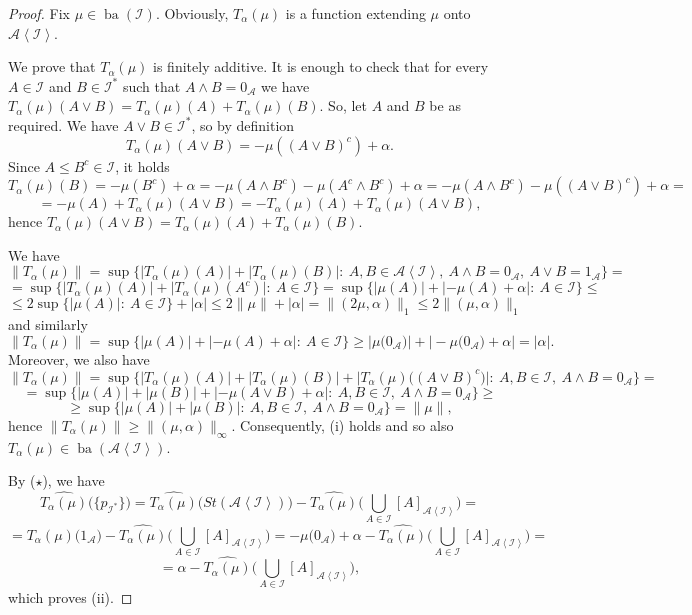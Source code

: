 \documentclass[a4paper,11pt,fleqn]{amsart}
\theoremstyle{definition}
\theoremstyle{remark}
\numberwithin{equation}{section}
\newcommand{\aA}{\mathcal{A}}
\newcommand{\iI}{\mathcal{I}}
\DeclareMathOperator{\ba}{ba}
\newcommand{\wh}{\widehat}
\newcommand{\gen}[1]{\mathopen{}\left\langle#1\mathclose{}\right\rangle}
\newcommand{\clopen}[1]{\left[#1\right]}
\begin{document}
\begin{proof}
Fix $\mu\in\ba(\iI)$. Obviously, $T_\alpha(\mu)$ is a function extending $\mu$ onto $\aA\gen{\iI}$.

We prove that $T_\alpha(\mu)$ is finitely additive. It is enough to check that for every $A\in\iI$ and $B\in\iI^*$ such that $A\wedge B=0_\aA$ we have $T_\alpha(\mu)(A\vee B)=T_\alpha(\mu)(A)+T_\alpha(\mu)(B)$. So, let $A$ and $B$ be as required. We have $A\vee B\in\iI^*$, so by  definition
\[T_\alpha(\mu)(A\vee B)=-\mu((A\vee B)^c)+\alpha.\]
Since $A\le B^c\in\iI$, it holds
\[T_\alpha(\mu)(B)=-\mu(B^c)+\alpha=-\mu(A\wedge B^c)-\mu(A^c\wedge B^c)+\alpha=-\mu(A\wedge B^c)-\mu((A\vee B)^c)+\alpha=\]
\[=-\mu(A)+T_\alpha(\mu)(A\vee B)=-T_\alpha(\mu)(A)+T_\alpha(\mu)(A\vee B),\]
hence $T_\alpha(\mu)(A\vee B)=T_\alpha(\mu)(A)+T_\alpha(\mu)(B)$.

\medskip

We have %
\[\big\|T_\alpha(\mu)\big\|=\sup\big\{\big|T_\alpha(\mu)(A)\big|+\big|T_\alpha(\mu)(B)\big|\colon\ A,B\in\aA\gen{\iI},\ A\wedge B=0_\aA,\ A\vee B=1_\aA\big\}=\]
\[=\sup\big\{\big|T_\alpha(\mu)(A)\big|+\big|T_\alpha(\mu)(A^c)\big|\colon\ A\in\iI\big\}=\sup\big\{|\mu(A)|+|-\mu(A)+\alpha|\colon\ A\in\iI\big\}\le\]
\[\le2\sup\big\{|\mu(A)|\colon\ A\in\iI\big\}+|\alpha|\le2\|\mu\|+|\alpha|=\|(2\mu,\alpha)\|_1\le2\|(\mu,\alpha)\|_1\]
and similarly
\[\big\|T_\alpha(\mu)\big\|=\sup\big\{|\mu(A)|+|-\mu(A)+\alpha|\colon\ A\in\iI\big\}\ge\big|\mu\big(0_\aA\big)\big|+\big|-\mu\big(0_\aA\big)+\alpha\big|=|\alpha|.\]
Moreover, we also have
\[\big\|T_\alpha(\mu)\big\|=\sup\Big\{\big|T_\alpha(\mu)(A)\big|+\big|T_\alpha(\mu)(B)\big|+\big|T_\alpha(\mu)\big((A\vee B)^c\big)\big|\colon\ A,B\in\iI,\ A\wedge B=0_\aA\Big\}=\]
\[=\sup\big\{|\mu(A)|+|\mu(B)|+|-\mu(A\vee B)+\alpha|\colon\ A,B\in\iI,\ A\wedge B=0_\aA\big\}\ge\]
\[\ge\sup\big\{|\mu(A)|+|\mu(B)|\colon\ A,B\in\iI,\ A\wedge B=0_\aA\big\}=\|\mu\|,\]
hence $\big\|T_\alpha(\mu)\big\|\ge\|(\mu,\alpha)\|_\infty$. Consequently, (i) holds and so also $T_\alpha(\mu)\in\ba(\aA\gen{\iI})$.

\medskip

By ($\star$), we have
\[\wh{T_\alpha(\mu)}\big(\big\{p_{\iI^*}\big\}\big)=\wh{T_\alpha(\mu)}\big(St(\aA\gen{\iI})\big)-\wh{T_\alpha(\mu)}\Big(\bigcup_{A\in\iI}\clopen{A}_{\aA\gen{\iI}}\Big)=\]
\[=T_\alpha(\mu)\big(1_\aA\big)-\wh{T_\alpha(\mu)}\Big(\bigcup_{A\in\iI}\clopen{A}_{\aA\gen{\iI}}\Big)=-\mu\big(0_\aA)+\alpha-\wh{T_\alpha(\mu)}\Big(\bigcup_{A\in\iI}\clopen{A}_{\aA\gen{\iI}}\Big)=\]
\[=\alpha-\wh{T_\alpha(\mu)}\Big(\bigcup_{A\in\iI}\clopen{A}_{\aA\gen{\iI}}\Big),\]
which proves (ii).


\end{proof}
\end{document}
